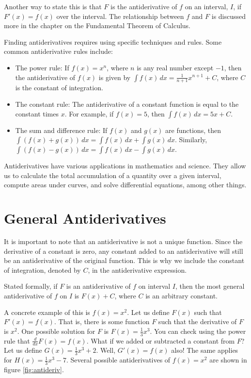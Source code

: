 Another way to state this is that $F$ is the antiderivative of $f$ on 
an interval, $I$, if $F'(x) = f(x)$ over the interval. The 
relationship between $f$ and $F$ is discussed more in the chapter on 
the Fundamental Theorem of Calculus. 

Finding antiderivatives requires using specific techniques and
rules. Some common antiderivative rules include:

\begin{itemize}
\item The power rule: If $f(x) = x^n$, where $n$ is any real number
  except $-1$, then the antiderivative of $f(x)$ is given by $\int
  f(x)\,dx = \frac{1}{n+1}x^{n+1} + C$, where $C$ is the constant of
  integration.

\item The constant rule: The antiderivative of a constant function is
  equal to the constant times $x$. For example, if $f(x) = 5$, then
  $\int f(x)\, dx = 5x + C$.

\item The sum and difference rule: If $f(x)$ and $g(x)$ are functions,
  then $\int (f(x) + g(x)) \, dx = \int f(x) \, dx + \int g(x) \,
  dx$. Similarly, $\int (f(x) - g(x))\,dx = \int f(x) \, dx - \int
  g(x) \, dx$.
\end{itemize}

Antiderivatives have various applications in mathematics and
science. They allow us to calculate the total accumulation of a
quantity over a given interval, compute areas under curves, and solve
differential equations, among other things.

\section{General Antiderivatives}

It is important to note that an antiderivative is not a unique
function. Since the derivative of a constant is zero, any constant
added to an antiderivative will still be an antiderivative of the
original function. This is why we include the constant of integration,
denoted by $C$, in the antiderivative expression.

Stated formally, if $F$ is an antiderivative of $f$ on interval $I$, 
then the most general antiderivative of $f$ on $I$ is $F(x) + C$, 
where $C$ is an arbitrary constant. 


A concrete example of this is $f(x) = x^2$. Let us define $F(x)$ such 
that $F'(x) = f(x)$. That is, there is some function $F$ such that the 
derivative of $F$ is $x^2$. One possible solution for $F$ is $F(x) = 
\frac{1}{3} x^3$. You can check using the power rule that $\frac{d}{dx} 
F(x) = f(x)$. What if we added or subtracted a constant from $F$? Let us 
define $G(x) = \frac{1}{3} x^3 + 2$. Well, $G'(x) = f(x)$ also! 
The same applies for $H(x) = \frac{1}{3} x^3 - 7$. Several possible antiderivatives 
of $f(x) = x^2$ are shown in figure \ref{fig:antideriv}. 

